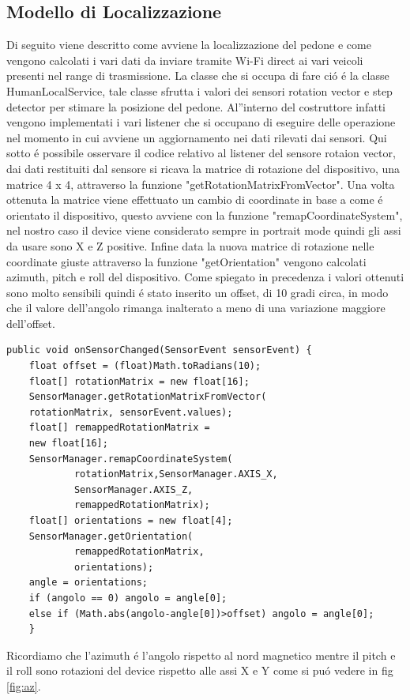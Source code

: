 \documentclass[conference]{IEEEtran}
\begin{document}
\subsection{Modello di Localizzazione}
Di seguito viene descritto come avviene la localizzazione del pedone e come vengono calcolati i vari dati da inviare tramite Wi-Fi direct ai vari veicoli presenti nel range di trasmissione. La classe che si occupa di fare ci\'o \'e la classe HumanLocalService, tale classe sfrutta i valori dei sensori rotation vector e step detector per stimare la posizione del pedone. Al''interno del costruttore infatti vengono implementati i vari listener che si occupano di eseguire delle operazione nel momento in cui avviene un aggiornamento nei dati rilevati dai sensori. 
Qui sotto \'e possibile osservare il codice relativo al listener del sensore rotaion vector, dai dati restituiti dal sensore si ricava la matrice di rotazione del dispositivo, una matrice 4 x 4, attraverso la funzione "getRotationMatrixFromVector". Una volta ottenuta la matrice viene effettuato un cambio di coordinate in base a come \'e orientato il dispositivo, questo avviene con la funzione "remapCoordinateSystem", nel nostro caso il device viene considerato sempre in portrait mode quindi gli assi da usare sono X e Z positive. Infine data la nuova matrice di rotazione nelle coordinate giuste attraverso la funzione "getOrientation" vengono calcolati azimuth, pitch e roll del dispositivo. Come spiegato in precedenza i valori ottenuti sono molto sensibili quindi \'e stato inserito un offset, di 10 gradi circa, in modo che il valore dell'angolo rimanga inalterato a meno di una variazione maggiore dell'offset. 
\begin{lstlisting}
public void onSensorChanged(SensorEvent sensorEvent) {
    float offset = (float)Math.toRadians(10);   
    float[] rotationMatrix = new float[16];
    SensorManager.getRotationMatrixFromVector(
    rotationMatrix, sensorEvent.values);
    float[] remappedRotationMatrix =
    new float[16];
    SensorManager.remapCoordinateSystem(
            rotationMatrix,SensorManager.AXIS_X,
            SensorManager.AXIS_Z,
            remappedRotationMatrix);
    float[] orientations = new float[4];
    SensorManager.getOrientation(
            remappedRotationMatrix,
            orientations);
    angle = orientations;
    if (angolo == 0) angolo = angle[0];
    else if (Math.abs(angolo-angle[0])>offset) angolo = angle[0];
    }
\end{lstlisting}
Ricordiamo che l'azimuth \'e l'angolo rispetto al nord magnetico mentre il pitch e il roll sono rotazioni del device rispetto alle assi X e Y come si pu\'o vedere in fig \ref{fig:az}.
\end{document}
